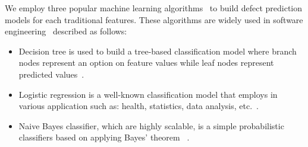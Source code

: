 We employ three popular machine learning algorithms~\cite{bishop2006pattern} to build defect prediction models for each traditional features. These algorithms are widely used in software engineering~\cite{wang2016automatically, wang2013using, jing2014dictionary} described as follows: 
\begin{itemize}
	\item Decision tree is used to build a tree-based classification model where branch nodes represent an option on feature values while leaf nodes represent predicted values~\cite{safavian1991survey}.
	\item Logistic regression is a well-known classification model that employs in various application such as: health, statistics, data analysis, etc.~\cite{hosmer2013applied}. 
	\item Naive Bayes classifier, which are highly scalable, is a simple probabilistic classifiers based on applying Bayes' theorem ~\cite{vapnik1998statistical}. 
\end{itemize}

